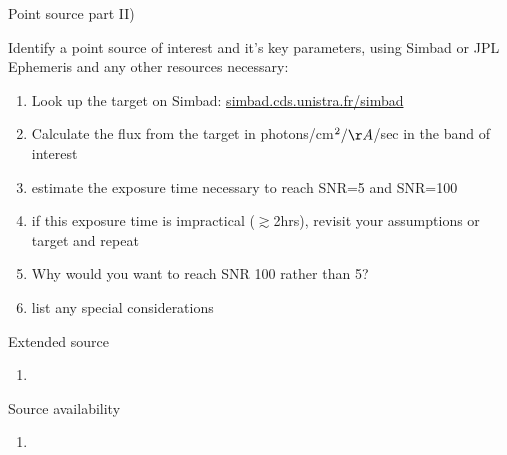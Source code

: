 \begin{frame}{Point source part II)}

Identify a point source of interest and it's key parameters, using Simbad or JPL Ephemeris and any other resources necessary:

 \begin{enumerate}
 \item Look up the target on Simbad: \url{simbad.cds.unistra.fr/simbad}
 \item Calculate the flux from the target in photons/cm$^2/\AA $/sec in the band of interest
 \item estimate the exposure time necessary to reach SNR=5 and SNR=100
 \item if this exposure time is impractical ($\gtrsim$2hrs), revisit your assumptions or target and repeat
 \item Why would you want to reach SNR 100 rather than 5?
 \item list any special considerations
\end{enumerate}
\end{frame}

\begin{frame}{Extended source}


 \begin{enumerate}
 \item
\end{enumerate}
\end{frame}



\begin{frame}{Source availability}


 \begin{enumerate}
 \item
\end{enumerate}
\end{frame}


